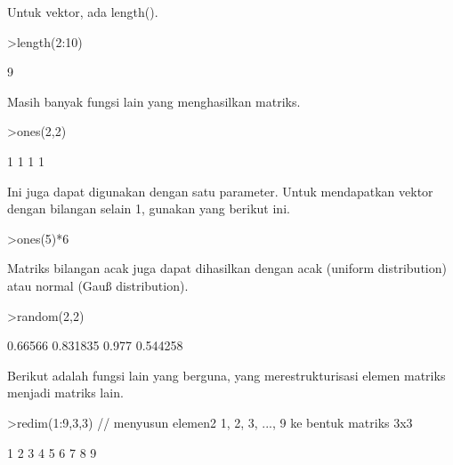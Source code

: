 \documentclass[a4paper,10pt]{article}
\begin{document}
\begin{eulernotebook}
\begin{eulercomment}
\begin{eulercomment}
\begin{eulercomment}
\begin{eulercomment}
\begin{eulercomment}
\begin{eulercomment}
\begin{eulercomment}
\begin{eulercomment}
\begin{eulercomment}
Untuk vektor, ada length().
\end{eulercomment}
\begin{eulerprompt}
>length(2:10)
\end{eulerprompt}
\begin{euleroutput}
  9
\end{euleroutput}
\begin{eulercomment}
Masih banyak fungsi lain yang menghasilkan matriks.
\end{eulercomment}
\begin{eulerprompt}
>ones(2,2)
\end{eulerprompt}
\begin{euleroutput}
              1             1 
              1             1 
\end{euleroutput}
\begin{eulercomment}
Ini juga dapat digunakan dengan satu parameter. Untuk mendapatkan
vektor dengan bilangan selain 1, gunakan yang berikut ini.
\end{eulercomment}
\begin{eulerprompt}
>ones(5)*6
\end{eulerprompt}
\begin{euleroutput}
  [6,  6,  6,  6,  6]
\end{euleroutput}
\begin{eulercomment}
Matriks bilangan acak juga dapat dihasilkan dengan acak (uniform
distribution) atau normal (Gauß distribution).
\end{eulercomment}
\begin{eulerprompt}
>random(2,2)
\end{eulerprompt}
\begin{euleroutput}
        0.66566      0.831835 
          0.977      0.544258 
\end{euleroutput}
\begin{eulercomment}
Berikut adalah fungsi lain yang berguna, yang merestrukturisasi elemen
matriks menjadi matriks lain.
\end{eulercomment}
\begin{eulerprompt}
>redim(1:9,3,3) // menyusun elemen2 1, 2, 3, ..., 9 ke bentuk matriks 3x3
\end{eulerprompt}
\begin{euleroutput}
              1             2             3 
              4             5             6 
              7             8             9 
\end{euleroutput}
\begin{eulercomment}

\end{eulercomment}
\end{eulercomment}
\end{eulercomment}
\end{eulercomment}
\end{eulercomment}
\end{eulercomment}
\end{eulercomment}
\end{eulercomment}
\end{eulercomment}
\end{eulernotebook}
\end{document}
